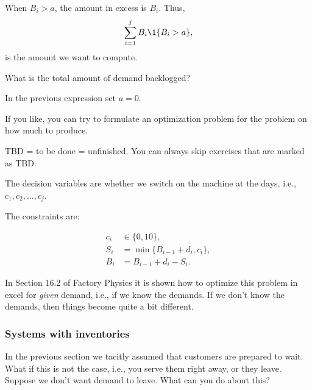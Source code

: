 \begin{solution}
    When $B_i>a$, the amount in excess is $B_i$. Thus, 
    \begin{equation*}
      \sum_{i=1}^j B_i \1{B_i > a},
    \end{equation*}
  is the amount we want to compute. 
\end{solution}


\begin{question}
  What is the total amount of demand backlogged? 
\end{question}

  \begin{solution}
    In the previous expression set $a=0$. 
  \end{solution}

\begin{question}[use=false]
  If you like, you can try to formulate an optimization problem for
  the problem on how much to produce. 
\end{question}

  \begin{solution}

    TBD = to be done = unfinished. You can always skip exercises that
    are marked as TBD.

The decision variables are whether we switch on the machine at the days, i.e., $c_1, c_2, \ldots, c_j$. 

The constraints are:

\begin{align*}
c_i &\in \{0, 10\}, \\
      S_i &= \min\{B_{i-1}+d_i, c_i\}, \\
  B_i &= B_{i-1}+d_i - S_i.
\end{align*}

In Section 16.2 of Factory Physics it is shown how to optimize this
problem in excel for \emph{given} demand, i.e., if we know the
demands.  If we don't know the demands, then things become quite a bit
different.

\end{solution}



\subsubsection{Systems with inventories}

\begin{question}
  In the previous section we tacitly assumed that customers are
  prepared to wait.  What if this is not the case, i.e., you serve
  them right away, or they leave. Suppose we don't want demand to
  leave. What can you do about this?
\end{question}

